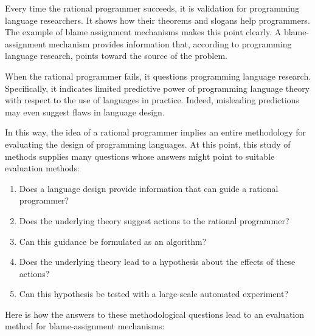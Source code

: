 

Every time the rational programmer succeeds, it is validation for programming
language researchers. It shows how their theorems and slogans help
programmers. The example of blame assignment mechanisms makes this point
clearly. A blame-assignment mechanism provides information that, according to
programming language research, points toward the source of the problem.

When the rational programmer fails, it questions programming
language research. Specifically, it indicates limited predictive
power of programming language theory with respect to the use of languages in
practice. Indeed, misleading predictions may even suggest flaws in language design.

In this way, the idea of a rational programmer implies an entire methodology for
evaluating the design of programming languages. At this point, this study of
methods supplies many questions whose answers might point to suitable evaluation
methods: 

\begin{enumerate} 

\item Does a language design provide information that can guide a
 rational programmer?

\item Does the underlying theory suggest actions to the rational programmer?

\item Can this guidance be formulated as an algorithm?

\item Does the underlying theory lead to a hypothesis about the effects of
 these actions? 

\item Can this hypothesis be tested with a large-scale automated experiment?

\end{enumerate}

Here is how the answers to these methodological questions lead to an evaluation
method for blame-assignment mechanisms: 

